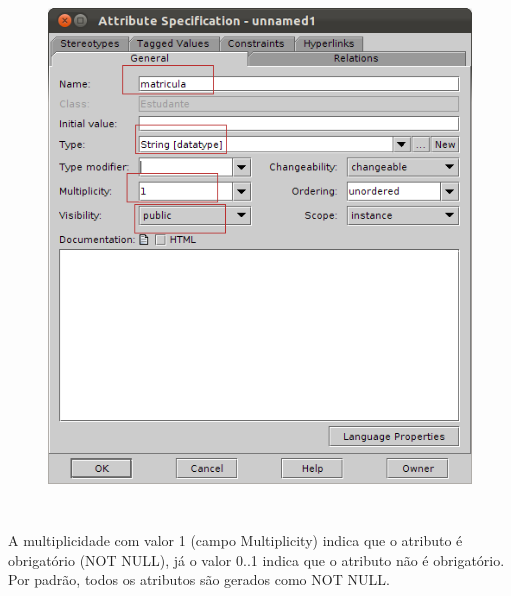 \begin{enumerate}
		\begin{figure}[!htb]
			\centering
			\includegraphics[width=350pt,height=400pt]{imgs/tutorial-mdarte-0002.png}
		\end{figure}
		
	A multiplicidade com valor 1 (campo Multiplicity) indica que o atributo é obrigatório (NOT
NULL), já o valor 0..1 indica que o atributo não é obrigatório. Por padrão, todos os atributos são
gerados como NOT NULL.
\end{enumerate}